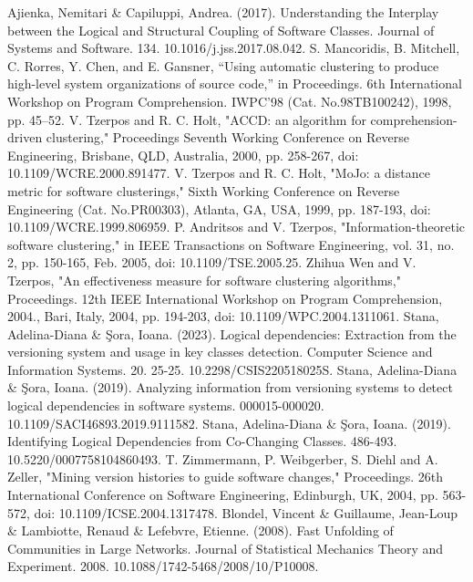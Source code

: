 \documentclass{ieeeaccess}
\begin{document}
\begin{thebibliography}{00}

 Ajienka, Nemitari \& Capiluppi, Andrea. (2017). Understanding the Interplay between the Logical and Structural Coupling of Software Classes. Journal of Systems and Software. 134. 10.1016/j.jss.2017.08.042.
 S. Mancoridis, B. Mitchell, C. Rorres, Y. Chen, and E. Gansner, “Using automatic clustering to produce high-level system organizations of source code,” in Proceedings. 6th International Workshop on Program Comprehension. IWPC’98 (Cat. No.98TB100242), 1998, pp. 45–52.
 V. Tzerpos and R. C. Holt, "ACCD: an algorithm for comprehension-driven clustering," Proceedings Seventh Working Conference on Reverse Engineering, Brisbane, QLD, Australia, 2000, pp. 258-267, doi: 10.1109/WCRE.2000.891477.
 V. Tzerpos and R. C. Holt, "MoJo: a distance metric for software clusterings," Sixth Working Conference on Reverse Engineering (Cat. No.PR00303), Atlanta, GA, USA, 1999, pp. 187-193, doi: 10.1109/WCRE.1999.806959.
 P. Andritsos and V. Tzerpos, "Information-theoretic software clustering," in IEEE Transactions on Software Engineering, vol. 31, no. 2, pp. 150-165, Feb. 2005, doi: 10.1109/TSE.2005.25. 
 Zhihua Wen and V. Tzerpos, "An effectiveness measure for software clustering algorithms," Proceedings. 12th IEEE International Workshop on Program Comprehension, 2004., Bari, Italy, 2004, pp. 194-203, doi: 10.1109/WPC.2004.1311061.
 Stana, Adelina-Diana \& Şora, Ioana. (2023). Logical dependencies: Extraction from the versioning system and usage in key classes detection. Computer Science and Information Systems. 20. 25-25. 10.2298/CSIS220518025S. 
 Stana, Adelina-Diana \& Şora, Ioana. (2019). Analyzing information from versioning systems to detect logical dependencies in software systems. 000015-000020. 10.1109/SACI46893.2019.9111582. 
 Stana, Adelina-Diana \& Şora, Ioana. (2019). Identifying Logical Dependencies from Co-Changing Classes. 486-493. 10.5220/0007758104860493. 
 T. Zimmermann, P. Weibgerber, S. Diehl and A. Zeller, "Mining version histories to guide software changes," Proceedings. 26th International Conference on Software Engineering, Edinburgh, UK, 2004, pp. 563-572, doi: 10.1109/ICSE.2004.1317478.
 Blondel, Vincent \& Guillaume, Jean-Loup \& Lambiotte, Renaud \& Lefebvre, Etienne. (2008). Fast Unfolding of Communities in Large Networks. Journal of Statistical Mechanics Theory and Experiment. 2008. 10.1088/1742-5468/2008/10/P10008. 

\end{thebibliography}
\end{document}
